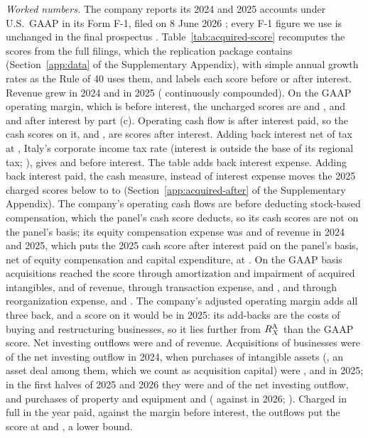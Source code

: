 \noindent\emph{Worked numbers.} The company reports its 2024 and 2025 accounts under U.S.\ GAAP in its Form F-1, filed on 8 June 2026 \citep{bendingspoons2026f1}; every F-1 figure we use is unchanged in the final prospectus \citep{bendingspoons2026prospectus}. Table~\ref{tab:acquired-score} recomputes the scores from the full filings, which the replication package contains (Section~\ref{app:data} of the Supplementary Appendix), with simple annual growth rates as the Rule of 40 uses them, and labels each score before or after interest. Revenue grew \acqGrowthTwentyFour{} in 2024 and \acqGrowthTwentyFive{} in 2025 (\acqLogGrowthTwentyFive{} continuously compounded). On the GAAP operating margin, which is before interest, the uncharged scores are \acqRGaapTwentyFour{} and \acqRGaapTwentyFive, and \acqRIntTwentyFour{} and \acqRIntTwentyFive{} after interest by part (c). Operating cash flow is after interest paid, so the cash scores on it, \acqROcfTwentyFour{} and \acqROcfTwentyFive, are scores after interest. Adding back interest net of tax at \acqTauIres, Italy's corporate income tax rate (interest is outside the base of its regional tax; \citealp{pwc2026italy}), gives \acqROcfUTwentyFour{} and \acqROcfUTwentyFive{} before interest. The table adds back interest expense. Adding back interest paid, the cash measure, instead of interest expense moves the 2025 charged scores below to \acqChPaidLo{} to \acqChPaidHi{} (Section~\ref{app:acquired-after} of the Supplementary Appendix). The company's operating cash flows are before deducting stock-based compensation, which the panel's cash score deducts, so its cash scores are not on the panel's basis; its equity compensation expense was \acqSbcTwentyFour{} and \acqSbcTwentyFive{} of revenue in 2024 and 2025, which puts the 2025 cash score after interest paid on the panel's basis, net of equity compensation and capital expenditure, at \acqROcfSbcTwentyFive. On the GAAP basis acquisitions reached the score through amortization and impairment of acquired intangibles, \acqAmzTwentyFour{} and \acqAmzTwentyFive{} of revenue, through transaction expense, \acqTrxTwentyFour{} and \acqTrxTwentyFive, and through reorganization expense, \acqReorgTwentyFour{} and \acqReorgTwentyFive. The company's adjusted operating margin adds all three back, and a score on it would be \acqRAdjTwentyFive{} in 2025: its add-backs are the costs of buying and restructuring businesses, so it lies further from $R^{\rm A}_X$ than the GAAP score. Net investing outflows were \acqCfiTwentyFour{} and \acqCfiTwentyFive{} of revenue. Acquisitions of businesses were \acqAcqShareTwentyFour{} of the net investing outflow in 2024, when purchases of intangible assets (\acqIntangTwentyFour, an asset deal among them, which we count as acquisition capital) were \acqIntangShareTwentyFour, and \acqAcqShareTwentyFiveTwo{} in 2025; in the first halves of 2025 and 2026 they were \acqAcqShareHOneFive{} and \acqAcqShareHOneSix{} of the net investing outflow, and purchases of property and equipment \acqCapexShareHOneFive{} and \acqCapexShareHOneSix{} (\acqCapexHOneSix{} against \acqAcqHOneSix{} in 2026; \citealp{bendingspoons2026sixk}). Charged in full in the year paid, against the margin before interest, the outflows put the score at \acqRAllInvUTwentyFour{} and \acqRAllInvUTwentyFive, a lower bound.

